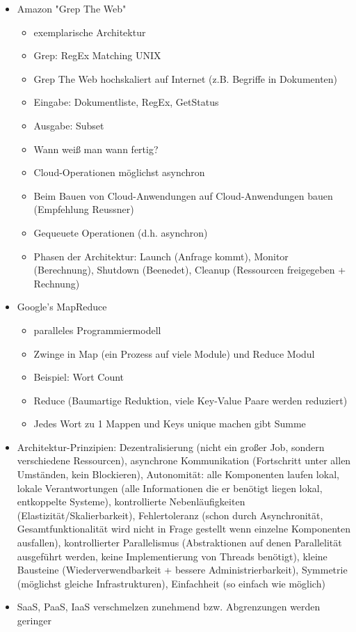 \documentclass[paper=a4, fontsize=11pt]{scrartcl} %
\numberwithin{equation}{section} %
\numberwithin{figure}{section} %
\numberwithin{table}{section} %
\begin{document}
\begin{itemize}
\begin{itemize}
  \end{itemize}
  \item Amazon "Grep The Web"
  \begin{itemize}
    \item exemplarische Architektur
    \item Grep: RegEx Matching UNIX
    \item Grep The Web hochskaliert auf Internet (z.B. Begriffe in Dokumenten)
    \item Eingabe: Dokumentliste, RegEx, GetStatus
    \item Ausgabe: Subset
    \item Wann weiß man wann fertig?
    \item Cloud-Operationen möglichst asynchron
    \item Beim Bauen von Cloud-Anwendungen auf Cloud-Anwendungen bauen (Empfehlung Reussner)
    \item Gequeuete Operationen (d.h. asynchron)
    \item Phasen der Architektur: Launch (Anfrage kommt), Monitor (Berechnung), Shutdown (Beenedet), Cleanup (Ressourcen freigegeben + Rechnung)
  \end{itemize}
  \item Google's MapReduce
  \begin{itemize}
    \item paralleles Programmiermodell
    \item Zwinge in Map (ein Prozess auf viele Module) und Reduce Modul
    \item Beispiel: Wort Count
    \item Reduce (Baumartige Reduktion, viele Key-Value Paare werden reduziert)
    \item Jedes Wort zu 1 Mappen und Keys unique machen gibt Summe
  \end{itemize}
  \item Architektur-Prinzipien: Dezentralisierung (nicht ein großer Job, sondern verschiedene Ressourcen), asynchrone Kommunikation (Fortschritt unter allen Umständen, kein Blockieren), Autonomität: alle Komponenten laufen lokal, lokale Verantwortungen (alle Informationen die er benötigt liegen lokal, entkoppelte Systeme), kontrollierte Nebenläufigkeiten (Elastizität/Skalierbarkeit), Fehlertoleranz (schon durch Asynchronität, Gesamtfunktionalität wird nicht in Frage gestellt wenn einzelne Komponenten ausfallen), kontrollierter Parallelismus (Abstraktionen auf denen Parallelität ausgeführt werden, keine Implementierung von Threads benötigt), kleine Bausteine (Wiederverwendbarkeit + bessere Administrierbarkeit), Symmetrie (möglichst gleiche Infrastrukturen), Einfachheit (so einfach wie möglich)
  \item SaaS, PaaS, IaaS verschmelzen zunehmend bzw. Abgrenzungen werden geringer
\end{itemize}
\end{document}

